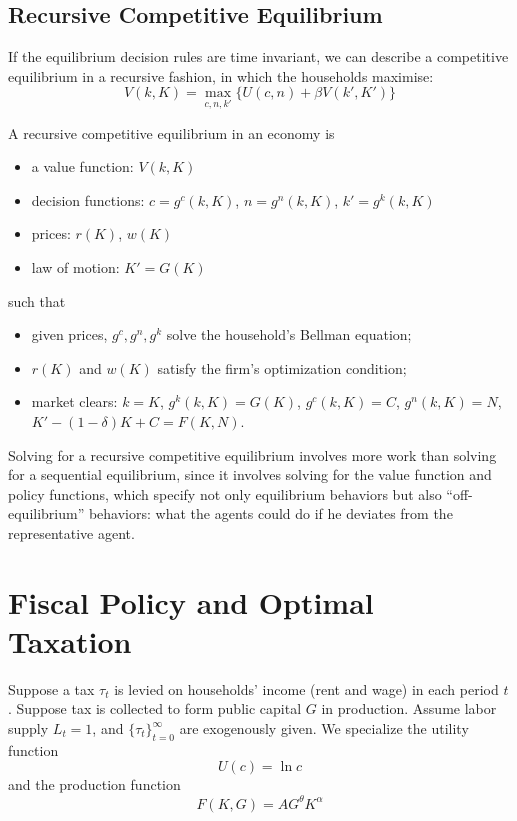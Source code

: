 \documentclass[10pt,a4]{article}
\begin{document}
\par\null

\subsection{Recursive Competitive
Equilibrium}

{\label{793453}}\par\null

If the equilibrium decision rules are time invariant, we can describe a competitive equilibrium in a recursive fashion, in which the households maximise:
$$ V(k,K) = \max_{c,n,k'} \{ U(c,n) + \beta V(k',K') \}$$

A recursive competitive equilibrium in an economy is 
\begin{itemize}
    \item a value function: $V(k,K)$
    \item decision functions: $c = g^c(k,K)$, $n = g^n(k,K)$, $k' = g^k(k,K)$
    \item prices: $r(K)$, $w(K)$
    \item law of motion: $K' = G(K)$
\end{itemize}
such that 
\begin{itemize}
    \item given prices, $g^c,g^n,g^k$ solve the household's Bellman equation;
    \item $r(K)$ and $w(K)$ satisfy the firm's optimization condition;
    \item market clears: $k=K$, $g^k(k,K) = G(K)$, $g^c(k,K)=C$, $g^n(k,K)=N$, $K'-(1-\delta)K + C=F(K,N)$.
\end{itemize}

Solving for a recursive competitive equilibrium involves more work than
solving for a sequential equilibrium, since it involves solving for the
value function and policy functions, which specify not only equilibrium
behaviors but also ``off-equilibrium'' behaviors: what the agents could
do if he deviates from the representative agent.


\newpage 

\section{Fiscal Policy and Optimal
Taxation~}

{\label{229543}}\par\null

Suppose a tax $\tau_t$ is levied on households' income (rent and wage) in each period $t$. Suppose tax is collected to form public capital $G$ in production. Assume labor supply $L_t=1$, and $\{\tau_t\}_{t=0}^{\infty}$ are exogenously given. We specialize the utility function
$$ U(c) = \ln c $$ 
and the production function
$$ F(K,G) = AG^{\theta}K^{\alpha}$$
\end{document}
